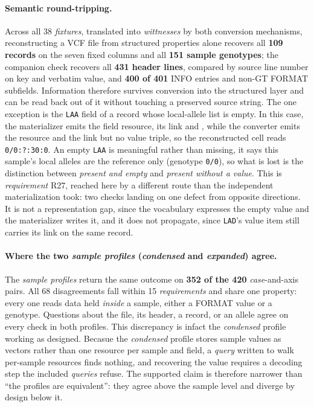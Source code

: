 \paragraph{Semantic round-tripping.}
Across all 38 \emph{fixtures}, translated into \emph{wittnesses} by both conversion mechanisms, reconstructing a VCF file from structured properties alone recovers all \textbf{109 records} on the seven fixed columns and all \textbf{151 sample genotypes}; the companion check recovers all \textbf{431 header lines}, compared by source line number on key and verbatim value, and \textbf{400 of 401} INFO entries and non-GT FORMAT subfields.
Information therefore survives conversion into the structured layer and can be read back out of it without touching a preserved source string.
The one exception is the \texttt{LAA} field of a record whose local-allele list is empty.
In this case, the materializer emits the field resource, its  link and , while the converter emits the resource and the link but no value triple, so the reconstructed cell reads \texttt{0/0:?:30:0}.
An empty \texttt{LAA} is meaningful rather than missing, it says this sample's local alleles are the reference only (genotype \texttt{0/0}), so what is lost is the distinction between \emph{present and empty} and \emph{present without a value}.
This is \emph{requirement} R27, reached here by a different route than the independent materialization took: two checks landing on one defect from opposite directions.
It is not a representation gap, since the vocabulary expresses the empty value and the materializer writes it, and it does not propagate, since \texttt{LAD}'s value item still carries its  link on the same record.

\paragraph{Where the two \emph{sample profiles} (\textit{condensed} and \textit{expanded}) agree.}
\label{sec:profilesresult}
The \emph{sample profiles} return the same outcome on \textbf{352 of the 420} \emph{case}-and-axis pairs.
All 68 disagreements fall within 15 \emph{requirements} and share one property: every one reads data held \emph{inside} a sample, either a FORMAT value or a genotype.
Questions about the file, its header, a record, or an allele agree on every check in both profiles.
This discrepancy is infact the \textit{condensed} profile working as designed. 
Becasue the \textit{condensed} profile stores sample values as vectors rather than one resource per sample and field, a \emph{query} written to walk per-sample resources finds nothing, and recovering the value requires a decoding step the included \emph{queries} refuse.
The supported claim is therefore narrower than ``the profiles are equivalent'': they agree above the sample level and diverge by design below it.

